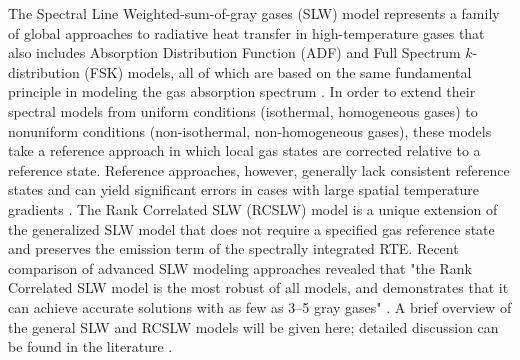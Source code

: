 \documentclass[preprint,12pt, a4paper]{elsarticle}
\begin{document}
The Spectral Line Weighted-sum-of-gray gases (SLW) model represents a family of global approaches to radiative heat transfer in high-temperature gases that also includes Absorption Distribution Function (ADF) and Full Spectrum $k$-distribution (FSK) models, all of which are based on the same fundamental principle in modeling the gas absorption spectrum \cite{Solovjov_2016}. In order to extend their spectral models from uniform conditions (isothermal, homogeneous gases) to nonuniform conditions (non-isothermal, non-homogeneous gases), these models take a reference approach in which local gas states are corrected relative to a reference state. Reference approaches, however, generally lack consistent reference states and can yield significant errors in cases with large spatial temperature gradients \cite{Solovjov_2017}. The Rank Correlated SLW (RCSLW) model is a unique extension of the generalized SLW model that does not require a specified gas reference state and preserves the emission term of the spectrally integrated RTE. Recent comparison of advanced SLW modeling approaches revealed that "the Rank Correlated SLW model is the most robust of all models, and demonstrates that it can achieve accurate solutions with as few as 3–5 gray gases" \citep{Badger_2019}. A brief overview of the general SLW and RCSLW models will be given here; detailed discussion can be found in the literature \cite{Solovjov_2000, Solovjov_2001, Solovjov_2008, Solovjov_2011, Solovjov_2014, Solovjov_2016, Solovjov_2017, Webb_2018}. 
\end{document}
